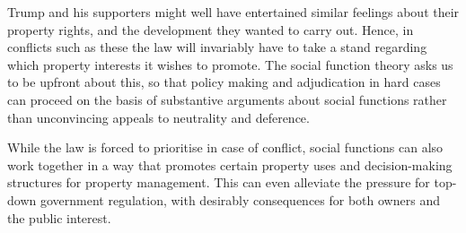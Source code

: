 Trump and his supporters might well have entertained similar feelings about their property rights, and the development they wanted to carry out. Hence, in conflicts such as these the law will invariably have to take a stand regarding which property interests it wishes to promote. The social function theory asks us to be upfront about this, so that policy making and adjudication in hard cases can proceed on the basis of substantive arguments about social functions rather than unconvincing appeals to neutrality and deference.

 
While the law is forced to prioritise in case of conflict, social functions can also work together in a way that promotes certain property uses and decision-making structures for property management. This can even alleviate the pressure for top-down government regulation, with desirably consequences for both owners and the public interest.



